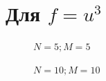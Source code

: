\documentclass[12pt]{extarticle}
\numberwithin{equation}{section}
\begin{document}
\section{Для $f=u^3$} 
\begin{figure}[H]
\begin{minipage}[h]{0.43\linewidth}
 $N=5; M=5$ \\
\end{minipage}
\hfill
\begin{minipage}[h]{0.43\linewidth}
 $N=10; M=10$ \\
\end{minipage}
\end{figure}
\end{document}
